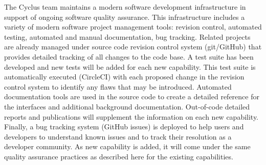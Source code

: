 \documentclass[dvips,12pt]{article}
\begin{document}
The Cyclus team maintains a modern software development infrastructure
in support of ongoing software quality assurance.  This infrastructure
includes a variety of modern software project management tools:
revision control, automated testing, automated and manual
documentation, bug tracking. Related projects are already managed
under source code revision control system (git/GitHub) that provides
detailed tracking of all changes to the code base. A test suite has
been developed and new tests will be added for each new
capability. This test suite is automatically executed (CircleCI) with
each proposed change in the revision control system to identify any
flaws that may be introduced. Automated documentation tools are used
in the source code to create a detailed reference for the interfaces
and additional background documentation. Out-of-code detailed reports
and publications will supplement the information on each new
capability. Finally, a bug tracking system (GitHub issues) is deployed
to help users and developers to understand known issues and to track
their resolution as a developer community. As new capability is added,
it will come under the same quality assurance practices as described
here for the existing capabilities.

\label{LastPage}
\end{document}
